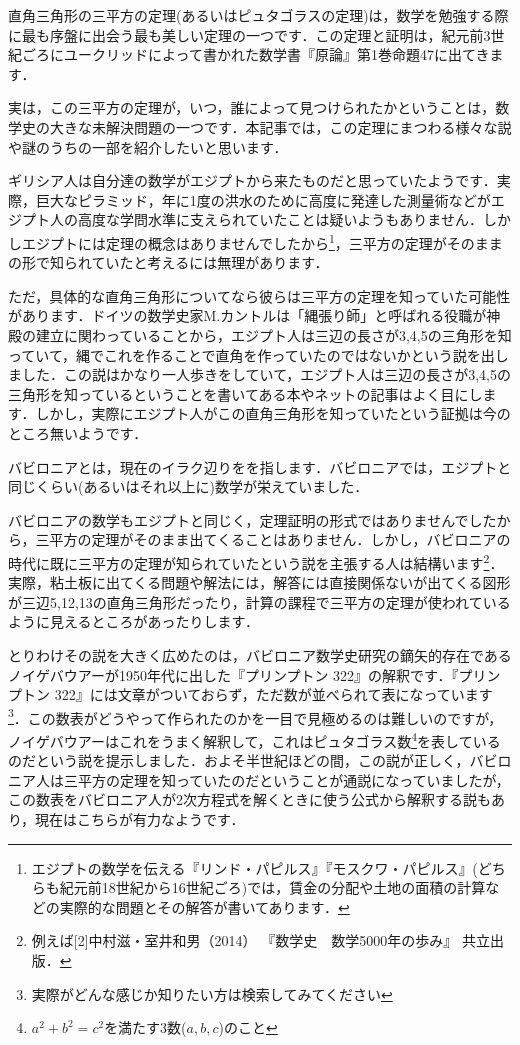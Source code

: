 \documentclass[./main]{subfiles}
\begin{document}

直角三角形の三平方の定理(あるいはピュタゴラスの定理)は，数学を勉強する際に最も序盤に出会う最も美しい定理の一つです．この定理と証明は，紀元前3世紀ごろにユークリッドによって書かれた数学書『原論』第1巻命題47に出てきます．

実は，この三平方の定理が，いつ，誰によって見つけられたかということは，数学史の大きな未解決問題の一つです．本記事では，この定理にまつわる様々な説や謎のうちの一部を紹介したいと思います．

ギリシア人は自分達の数学がエジプトから来たものだと思っていたようです．実際，巨大なピラミッド，年に1度の洪水のために高度に発達した測量術などがエジプト人の高度な学問水準に支えられていたことは疑いようもありません．しかしエジプトには定理の概念はありませんでしたから\footnote{エジプトの数学を伝える『リンド・パピルス』『モスクワ・パピルス』(どちらも紀元前18世紀から16世紀ごろ)では，賃金の分配や土地の面積の計算などの実際的な問題とその解答が書いてあります．}，三平方の定理がそのままの形で知られていたと考えるには無理があります．

ただ，具体的な直角三角形についてなら彼らは三平方の定理を知っていた可能性があります．ドイツの数学史家M.カントルは「縄張り師」と呼ばれる役職が神殿の建立に関わっていることから，エジプト人は三辺の長さが3,4,5の三角形を知っていて，縄でこれを作ることで直角を作っていたのではないかという説を出しました．この説はかなり一人歩きをしていて，エジプト人は三辺の長さが3,4,5の三角形を知っているということを書いてある本やネットの記事はよく目にします．しかし，実際にエジプト人がこの直角三角形を知っていたという証拠は今のところ無いようです．


バビロニアとは，現在のイラク辺りをを指します．バビロニアでは，エジプトと同じくらい(あるいはそれ以上に)数学が栄えていました．

バビロニアの数学もエジプトと同じく，定理証明の形式ではありませんでしたから，三平方の定理がそのまま出てくることはありません．しかし，バビロニアの時代に既に三平方の定理が知られていたという説を主張する人は結構います\footnote{例えば[2]中村滋・室井和男（2014） 『数学史　数学5000年の歩み』 共立出版．}．実際，粘土板に出てくる問題や解法には，解答には直接関係ないが出てくる図形が三辺5,12,13の直角三角形だったり，計算の課程で三平方の定理が使われているように見えるところがあったりします．

とりわけその説を大きく広めたのは，バビロニア数学史研究の鏑矢的存在であるノイゲバウアーが1950年代に出した『プリンプトン 322』の解釈です．『プリンプトン 322』には文章がついておらず，ただ数が並べられて表になっています\footnote{実際がどんな感じか知りたい方は検索してみてください}．この数表がどうやって作られたのかを一目で見極めるのは難しいのですが，ノイゲバウアーはこれをうまく解釈して，これはピュタゴラス数\footnote{$a^2 + b^2 = c^2$を満たす3数($a,b,c$)のこと}を表しているのだという説を提示しました．およそ半世紀ほどの間，この説が正しく，バビロニア人は三平方の定理を知っていたのだということが通説になっていましたが，この数表をバビロニア人が2次方程式を解くときに使う公式から解釈する説もあり，現在はこちらが有力なようです．
\end{document}
